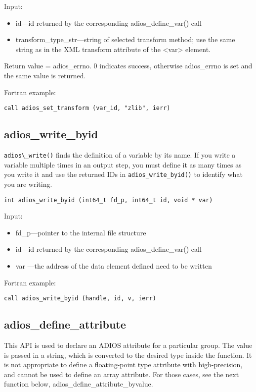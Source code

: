 Input:
\begin{itemize}
\item id---id returned by the corresponding adios\_define\_var() call
\item transform\_type\_str---string of selected transform method; use the same string as in the XML transform attribute of the <var> element.
\end{itemize}

Return value = adios\_errno. 0 indicates success, otherwise adios\_errno is set and the same value is returned. 

Fortran example: 
\begin{lstlisting}[alsolanguage=Fortran,caption={},label={}]
call adios_set_transform (var_id, "zlib", ierr)
\end{lstlisting}


\subsection{adios\_write\_byid}
\verb+adios\_write()+ finds the definition of a variable by its name. If you write
a variable multiple times in an output step, you must define it as many times as you
write it and use the returned IDs in \verb+adios_write_byid()+ to identify what you
are writing.

\begin{lstlisting}[alsolanguage=C,caption={},label={}]
int adios_write_byid (int64_t fd_p, int64_t id, void * var)
\end{lstlisting}

Input:
\begin{itemize}
\item fd\_p---pointer to the internal file structure
\item id---id returned by the corresponding adios\_define\_var() call
\item var ---the address of the data element defined need to be written
\end{itemize}

Fortran example: 
\begin{lstlisting}[alsolanguage=Fortran,caption={},label={}]
call adios_write_byid (handle, id, v, ierr)
\end{lstlisting}


\subsection{adios\_define\_attribute}

This API is used to declare an ADIOS attribute for a particular group. The value is passed in a string, which is converted to the desired type inside the function. It is not appropriate to define a floating-point type attribute with high-precision, and cannot be used to define an array attribute. For those cases, see the next function below, 
adios\_define\_attribute\_byvalue. 

